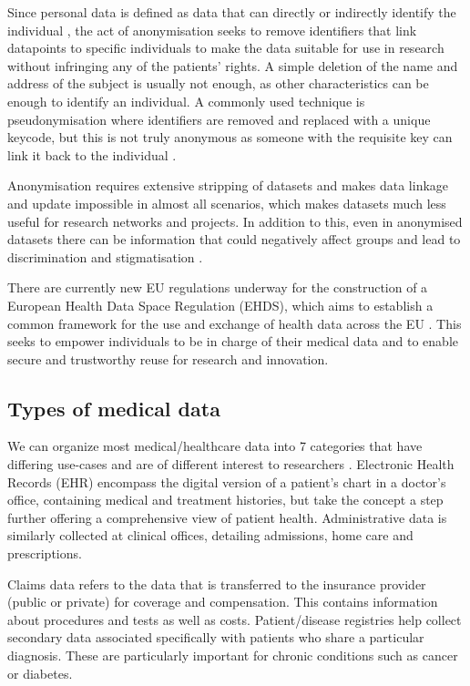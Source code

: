 	Since personal data is defined as data that can directly or indirectly identify the individual \cite{personal}, the act of anonymisation seeks to remove identifiers that link datapoints to specific individuals to make the data suitable for use in research without infringing any of the patients' rights. A simple deletion of the name and address of the subject is usually not enough, as other characteristics can be enough to identify an individual. A commonly used technique is pseudonymisation where identifiers are removed and replaced with a unique keycode, but this is not truly anonymous as someone with the requisite key can link it back to the individual \cite{dataprot}. 
	
	Anonymisation requires extensive stripping of datasets and makes data linkage and update impossible in almost all scenarios, which makes datasets much less useful for research networks and projects. In addition to this, even in anonymised datasets there can be information that could negatively affect groups and lead to discrimination and stigmatisation \cite{mittelstadt2016ethics}.
	
	There are currently new EU regulations underway for the construction of a European Health Data Space Regulation (EHDS), which aims to establish a common framework for the use and exchange of health data across the EU \cite{ehds}. This seeks to empower individuals to be in charge of their medical data and to enable secure and trustworthy reuse for research and innovation.
	
	\subsection{Types of medical data}
	
	We can organize most medical/healthcare data into 7 categories that have differing use-cases and are of different interest to researchers \cite{healthcaredata}. Electronic Health Records (EHR) encompass the digital version of a patient's chart in a doctor's office, containing medical and treatment histories, but take the concept a step further offering a comprehensive view of patient health. Administrative data is similarly collected at clinical offices, detailing admissions, home care and prescriptions.
	
	Claims data refers to the data that is transferred to the insurance provider (public or private) for coverage and compensation. This contains information about procedures and tests as well as costs. Patient/disease registries help collect secondary data associated specifically with patients who share a particular diagnosis. These are particularly important for chronic conditions such as cancer or diabetes.
	
